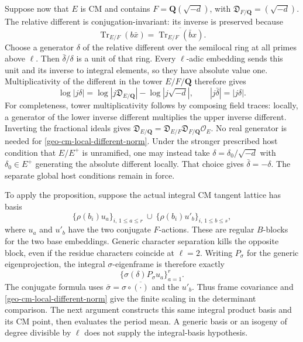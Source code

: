 Suppose now that $E$ is CM and contains
$F=\mathbf Q(\sqrt{-d})$, with
$\mathfrak D_{F/\mathbf Q}=(\sqrt{-d})$.
The relative different is conjugation-invariant: its inverse is
preserved because
\[
 \operatorname{Tr}_{E/F}(b\bar x)
       =\overline{\operatorname{Tr}_{E/F}(\bar b x)}.
\]
Choose a generator $\delta$ of the relative different over the
semilocal ring at all primes above $\ell$. Then
$\bar\delta/\delta$ is a unit of that ring. Every $\ell$-adic
embedding sends this unit and its inverse to integral elements,
so they have absolute value one. Multiplicativity of the different
in the tower $E/F/\mathbf Q$ therefore gives
\begin{equation}\label{geo-cm-local-different-norm}
 \log|j\delta|
  =\log|j\mathfrak D_{E/\mathbf Q}|-\log|j\sqrt{-d}|,
 \qquad |j\bar\delta|=|j\delta|.
\end{equation}
For completeness, tower multiplicativity follows by composing field
traces: locally, a generator of the lower inverse different multiplies
the upper inverse different. Inverting the fractional ideals gives
$\mathfrak D_{E/\mathbf Q}
=\mathfrak D_{E/F}\mathfrak D_{F/\mathbf Q}\mathcal O_E$.
No real generator is needed for
\eqref{geo-cm-local-different-norm}. Under the stronger prescribed
host condition that $E/E^+$ is unramified, one may instead take
$\delta=\delta_0/\sqrt{-d}$ with $\delta_0\in E^+$ generating
the absolute different locally. That choice gives $\bar\delta=-\delta$.
The separate global host conditions remain in force.

To apply the proposition, suppose the actual integral CM tangent
lattice has basis
\[
 \{\rho(b_i)u_a\}_{i,\,1\le a\le r}
       \ \cup\ \{\rho(b_i)u'_b\}_{i,\,1\le b\le s},
\]
where $u_a$ and $u'_b$ have the two conjugate $F$-actions.
These are regular $B$-blocks for the two base embeddings.
Generic character separation kills the opposite block, even if
the residue characters coincide at $\ell=2$.
Writing $P_\sigma$ for the generic eigenprojection, the integral
$\sigma$-eigenframe is therefore exactly
\[
                  \{\sigma(\delta)P_\sigma u_a\}_{a=1}^r.
\]
The conjugate formula uses $\bar\sigma=\sigma\circ\overline{(\cdot)}$
and the $u'_b$. Thus frame covariance and
\eqref{geo-cm-local-different-norm} give the finite scaling in the
determinant comparison. The next argument constructs this same
integral product basis and its CM point, then evaluates the period mean.
A generic basis or an isogeny of degree divisible by $\ell$ does not
supply the integral-basis hypothesis.
